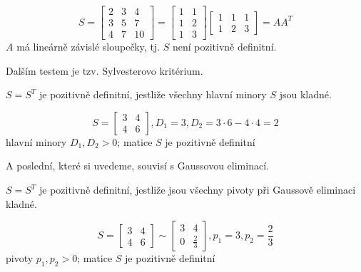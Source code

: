 \begin{pr}
    $$
        S = 
        \begin{bmatrix}
            2 & 3 & 4 \\
            3 & 5 & 7 \\
            4 & 7 & 10
        \end{bmatrix} =
        \begin{bmatrix}
            1 & 1 \\
            1 & 2 \\
            1 & 3
        \end{bmatrix}
        \begin{bmatrix}
            1 & 1 & 1 \\
            1 & 2 & 3
        \end{bmatrix} =
        AA^T
    $$
    $A$ má lineárně závislé sloupečky, tj. $S$ není pozitivně definitní.
\end{pr}

Dalším testem je tzv. Sylvesterovo kritérium.

\begin{vt}
    $S = S^T$ je pozitivně definitní, jestliže všechny hlavní minory $S$ jsou kladné.
\end{vt}

\begin{pr}
    $$  S =
        \begin{bmatrix}
            3 & 4 \\
            4 & 6
        \end{bmatrix},
        D_1 = 3,
        D_2 = 3 \cdot 6 - 4 \cdot 4 = 2 
    $$
    hlavní minory $D_1, D_2 > 0$; matice $S$ je pozitivně definitní 
\end{pr}

A poslední, které si uvedeme, souvisí s Gaussovou eliminací.

\begin{vt}
    $S = S^T$ je pozitivně definitní, jestliže jsou všechny pivoty při Gaussově eliminaci kladné.
\end{vt}

\begin{pr}
    $$  S =
        \begin{bmatrix}
            3 & 4 \\
            4 & 6
        \end{bmatrix}
        \sim
        \begin{bmatrix}
            3 & 4 \\
            0 & \frac{2}{3}
        \end{bmatrix},
        p_1 = 3, p_2 = \frac{2}{3} 
    $$
    pivoty $p_1, p_2 > 0$; matice $S$ je pozitivně definitní
\end{pr}

